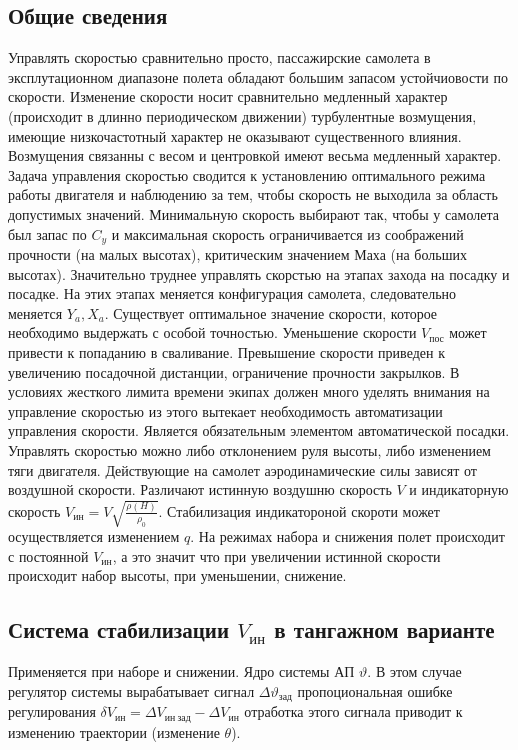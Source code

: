 \documentclass{article}
\begin{document}
\subsection{Общие сведения}
Управлять скоростью сравнительно просто, пассажирские самолета в эксплутационном диапазоне полета обладают большим запасом устойчиовости по скорости. Изменение скорости носит сравнительно медленный характер (происходит в длинно периодическом движении) турбулентные возмущения, имеющие низкочастотный характер не оказывают существенного влияния.
Возмущения связанны с весом и центровкой имеют весьма медленный характер.
Задача управления скоростью сводится к установлению оптимального режима работы двигателя и наблюдению за тем, чтобы скорость не выходила за область допустимых значений.
Минимальную скорость выбирают так, чтобы у самолета был запас по $C_y$ и максимальная скорость ограничивается из соображений прочности (на малых высотах), критическим значением Маха (на больших высотах).
Значительно труднее управлять скорстью на этапах захода на посадку и посадке.
На этих этапах меняется конфигурация самолета, следовательно меняется $Y_a, X_a$.
Существует оптимальное значение скорости, которое необходимо выдержать с особой точностью. Уменьшение скорости $V_{пос}$ может привести к попаданию в сваливание. Превышение скорости приведен к увеличению посадочной дистанции, ограничение прочности закрылков. В условиях жесткого лимита времени экипах должен много уделять внимания на управление скоростью из этого вытекает необходимость автоматизации управления скорости. Является обязательным элементом автоматической посадки.\\
Управлять скоростью можно либо отклонением руля высоты, либо изменением тяги двигателя. Действующие на самолет аэродинамические силы зависят от воздушной скорости. Различают истинную воздушню скорость $V$ и индикаторную скорость $V_{ин} = V \sqrt{\frac{\rho(H)}{\rho_0}}$. Стабилизация индикатороной скороти может осуществляется изменением $q$. На режимах набора и снижения полет происходит с постоянной $ V_{ин} $, а это значит что при увеличении истинной скорости происходит набор высоты, при уменьшении, снижение.
\subsection{Система стабилизации $ V_{ин}$ в тангажном варианте}
Применяется при наборе и снижении. Ядро системы АП $\vartheta$. В этом случае регулятор системы вырабатывает сигнал $\Delta \vartheta_{зад}$ пропоциональная ошибке регулирования $\delta V_{ин} = \Delta V_{ин \ зад} - \Delta V_{ин}$ отработка этого сигнала приводит к изменению траектории (изменение $\theta$).
\end{document}
